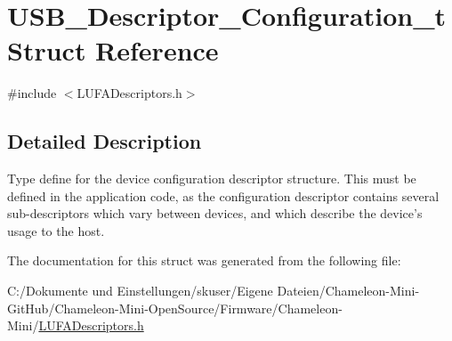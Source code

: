 \hypertarget{struct_u_s_b___descriptor___configuration__t}{\section{U\-S\-B\-\_\-\-Descriptor\-\_\-\-Configuration\-\_\-t Struct Reference}
\label{struct_u_s_b___descriptor___configuration__t}
}


{\ttfamily \#include $<$L\-U\-F\-A\-Descriptors.\-h$>$}



\subsection{Detailed Description}
Type define for the device configuration descriptor structure. This must be defined in the application code, as the configuration descriptor contains several sub-\/descriptors which vary between devices, and which describe the device's usage to the host. 

The documentation for this struct was generated from the following file\-:\begin{DoxyCompactItemize}
\item 
C\-:/\-Dokumente und Einstellungen/skuser/\-Eigene Dateien/\-Chameleon-\/\-Mini-\/\-Git\-Hub/\-Chameleon-\/\-Mini-\/\-Open\-Source/\-Firmware/\-Chameleon-\/\-Mini/\hyperlink{_l_u_f_a_descriptors_8h}{L\-U\-F\-A\-Descriptors.\-h}\end{DoxyCompactItemize}
